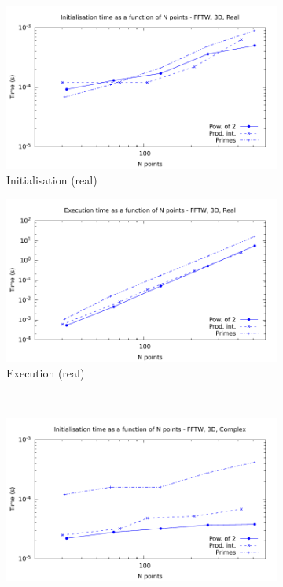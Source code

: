 \documentclass[12pt, a4paper]{article} \setlength{\textheight}{24cm}
\begin{document}
\begin{figure}[H]
  \captionsetup{width=0.8\linewidth}
  \centering
  \begin{subfigure}{.5\textwidth}
    \centering
    \includegraphics[width=.9\linewidth]{graphs/3d-fftw-init-r.pdf}
    \caption{Initialisation (real)}
    \label{3DFFTWRI}
  \end{subfigure}%
  \begin{subfigure}{.5\textwidth}
    \centering
    \includegraphics[width=.9\linewidth]{graphs/3d-fftw-exec-r.pdf}
    \caption{Execution (real)}
    \label{3DFFTWR}
  \end{subfigure}\\
  \begin{subfigure}{.5\textwidth}
    \centering
    \includegraphics[width=.9\linewidth]{graphs/3d-fftw-init-c.pdf}

\end{subfigure}
\end{figure}
\end{document}
